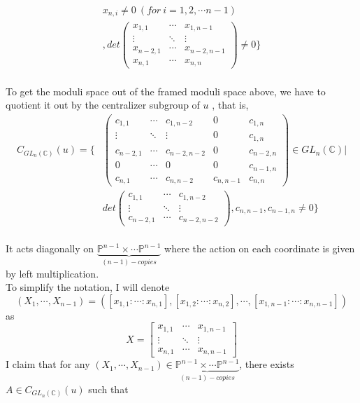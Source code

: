 \begin{example}
\begin{align*}
		x_{n,i}\neq 0~(for~i=1,2,\cdots n-1)\\
		,
		det
		\left( \begin{array}{ccc}
			x_{1,1}&\cdots &x_{1,n-1}\\
			\vdots &\ddots & \vdots \\
			x_{n-2,1}&\cdots &x_{n-2,n-1}\\
			x_{n,1}&\cdots & x_{n,n}
		\end{array}\right)
		\neq 0\}
	\end{align*}
\bigskip
\\
To get the moduli space out of the framed moduli space above, we have to quotient it out by the centralizer subgroup of $u$  
, that is,
	\begin{align*}
		C_{GL_n(\mathbb{C})}(u) = \{ 
		&\left(\begin{array}{ccc|cc}
			c_{1,1}&\cdots&c_{1,n-2}&0&c_{1,n}\\
			\vdots&\ddots&\vdots&0&c_{1,n}\\
			c_{n-2,1}&\cdots&c_{n-2,n-2}&0&c_{n-2,n}\\
			\hline
			0&\cdots&0&0&c_{n-1,n}\\
			c_{n,1}&\cdots&c_{n,n-2}&c_{n,n-1}&c_{n,n}
		\end{array}\right)\in GL_{n}(\mathbb{C})|\\
		&det
		\left(\begin{array}{ccc}
			c_{1,1}&\cdots&c_{1,n-2}\\
			\vdots&\ddots&\vdots\\
			c_{n-2,1}&\cdots&c_{n-2,n-2}
		\end{array}\right),c_{n,n-1},c_{n-1,n}\neq 0\}
	\end{align*}\\
It acts diagonally on $\underbrace{\mathbb{P}^{n-1}\times\cdots\mathbb{P}^{n-1}}_{(n-1)-copies}$ where the action on each coordinate is given by left multiplication. \\
To simplify the notation, I will denote 
\[
	(X_1,\cdots,X_{n-1})=([x_{1,1}:\cdots:x_{n,1}],[x_{1,2}:				\cdots:x_{n,2}],
	\cdots,
	[x_{1,n-1}:\cdots:x_{n,n-1}])\] as 
\[
	X
	=
	\begin{bmatrix}
		x_{1,1}&\cdots&x_{1,n-1}\\
		\vdots&\ddots&\vdots\\
		x_{n,1}&\cdots&x_{n,n-1}
	\end{bmatrix}
\]
I claim that for any $(X_1,\cdots,X_{n-1}) \in \underbrace{\mathbb{P}^{n-1}\times\cdots\mathbb{P}^{n-1}}_{(n-1)-copies}$, there exists $A\in C_{GL_n(\mathbb{C})}(u)$ such that 

\end{example}

